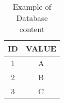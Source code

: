 
\begin{table}[h]
  \centering
  \begin{tabular}{c c}
    \toprule
      \textbf{ID} & \textbf{VALUE} \\
    \midrule
      1 & A \\
      2 & B \\
      3 & C \\
    \bottomrule
  \end{tabular}
  \caption{Example of Database content}
  \label{code:db}
\end{table}

